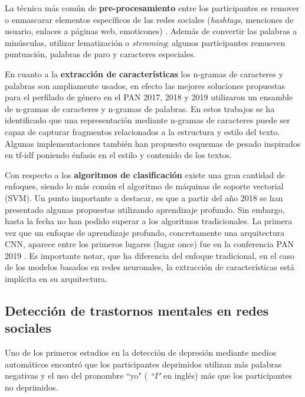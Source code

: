 La técnica más común de \textbf{pre-procesamiento} entre los participantes es remover o enmascarar elementos específicos de las redes sociales (\textit{hashtags}, menciones de usuario, enlaces a páginas web, emoticones) \citep{daneshvar2018gender, jimenez2019bots, Pizarro2019}. Además de convertir las palabras a minúsculas, utilizar lematización  o \textit{stemming}; algunos participantes remueven puntuación, palabras de paro y caracteres especiales.

En cuanto a la \textbf{extracción de características} los n-gramas de caracteres y palabras son ampliamente usados, en efecto las mejores soluciones propuestas para el perfilado de género en el PAN 2017, 2018 y 2019 \citep{basile2017there, daneshvar2018gender, Pizarro2019} utilizaron un ensamble de n-gramas de caracteres y n-gramas de palabras. En estos trabajos se ha identificado que una representación mediante n-gramas de caracteres puede ser capaz de capturar fragmentos relacionados a la estructura y estilo del texto. Algunas implementaciones también han propuesto esquemas de pesado inspirados en tf-idf poniendo énfasis en el estilo y contenido de los textos.


Con respecto a los \textbf{algoritmos de clasificación} existe una gran cantidad de enfoques, siendo lo más común el algoritmo de máquinas de soporte vectorial (SVM). Un punto importante a destacar, es que a partir del año 2018 se han presentado algunas propuestas utilizando aprendizaje profundo. Sin embargo, hasta la fecha no han podido superar a los algoritmos tradicionales. 
La primera vez que un enfoque de aprendizaje profundo, concretamente una arquitectura CNN, aparece entre los primeros lugares (lugar once) fue en la conferencia PAN 2019 \citep{Rangel2019}. Es importante notar, que ha diferencia del enfoque tradicional, en el caso de los modelos basados en redes neuronales, la extracción de características está implícita en su arquitectura.

\subsection{Detección de trastornos mentales en redes sociales}
Uno de los primeros estudios en la detección de depresión mediante medios automáticos \citep{rude2004language} encontró que los participantes deprimidos utilizan más palabras negativas y el uso del pronombre ``yo" ( \textit{``I"} en inglés) más que los participantes no deprimidos. 

